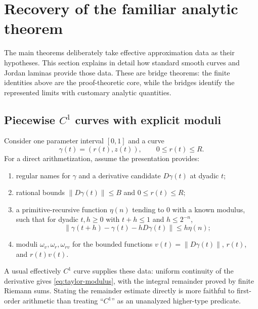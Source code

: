 \documentclass[11pt]{article}
\theoremstyle{definition}
\newcommand{\norm}[1]{\left\lVert#1\right\rVert}
\begin{document}
\section{Recovery of the familiar analytic theorem}
\label{sec:bridges}

The main theorems deliberately take effective approximation data as their
hypotheses.  This section explains in detail how standard smooth curves and
Jordan laminas provide those data.  These are bridge theorems: the finite
identities above are the proof-theoretic core, while the bridges identify the
represented limits with customary analytic quantities.

\subsection{Piecewise \texorpdfstring{$C^1$}{C1} curves with explicit moduli}

Consider one parameter interval $[0,1]$ and a curve
\[
 \gamma(t)=(r(t),z(t)),\qquad0\leq r(t)\leq R.
\]
For a direct arithmetization, assume the presentation provides:
\begin{enumerate}[label=(\alph*),leftmargin=2.3em]
\item regular names for $\gamma$ and a derivative candidate
$D\gamma(t)$ at dyadic $t$;
\item rational bounds $\norm{D\gamma(t)}\leq B$ and $0\leq r(t)\leq R$;
\item a primitive-recursive function $\eta(n)$ tending to $0$ with a known
modulus, such that for dyadic $t,h\geq0$ with $t+h\leq1$ and $h\leq2^{-n}$,
\begin{equation}
 \norm{\gamma(t+h)-\gamma(t)-hD\gamma(t)}\leq h\eta(n);
 \label{eq:taylor-modulus}
\end{equation}
\item moduli $\omega_v,\omega_r,\omega_{rv}$ for the bounded functions
$v(t)=\norm{D\gamma(t)}$, $r(t)$, and $r(t)v(t)$.
\end{enumerate}
A usual effectively $C^1$ curve supplies these data: uniform continuity of the
derivative gives \eqref{eq:taylor-modulus}, with the integral remainder proved
by finite Riemann sums.  Stating the remainder estimate directly is more
faithful to first-order arithmetic than treating ``$C^1$'' as an unanalyzed
higher-type predicate.
\end{document}
